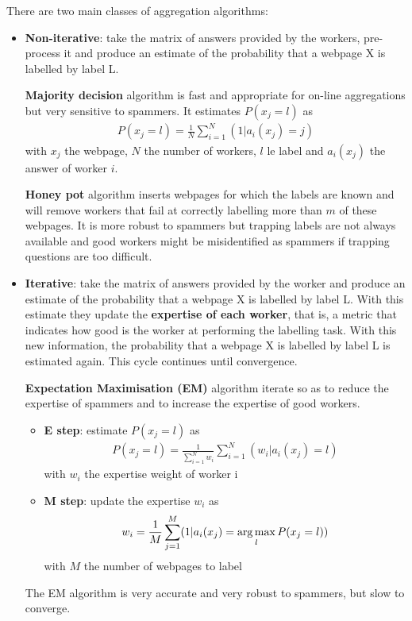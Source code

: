 There are two main classes of aggregation algorithms:
\begin{itemize}
	\item \textbf{Non-iterative}: take the matrix of answers provided by the workers, pre-process it and produce an estimate of the probability that a webpage X is labelled by label L.

	\textbf{Majority decision} algorithm is fast and appropriate for on-line aggregations but very sensitive to spammers. It estimates $P(x_j = l)$ as 
	\begin{align*}
		P(x_j = l) = \frac{1}{N} \sum_{i = 1}^N (1 | a_i(x_j) = j)
	\end{align*}
	with $x_j$ the webpage, $N$ the number of workers, $l$ le label and $a_i(x_j)$ the answer of worker $i$.

	\textbf{Honey pot} algorithm inserts webpages for which the labels are known and will remove workers that fail at correctly labelling more than $m$ of these webpages. It is more robust to spammers but trapping labels are not always available and good workers might be misidentified as spammers if trapping questions are too difficult.

	\item \textbf{Iterative}: take the matrix of answers provided by the worker and produce an estimate of the probability that a webpage X is labelled by label L. With this estimate they update the \textbf{expertise of each worker}, that is, a metric that indicates how good is the worker at performing the labelling task. With this new information, the probability that a webpage X is labelled by label L is estimated again. This cycle continues until convergence.

	\textbf{Expectation Maximisation (EM)} algorithm iterate so as to reduce the expertise of spammers and to increase the expertise of good workers.
	\begin{itemize}
		\item \textbf{E step}: estimate $P(x_j = l)$ as
		\begin{align*}
			P(x_j = l) = \frac{1}{\sum_{i = 1}^N w_i} \sum_{i = 1}^N (w_i | a_i(x_j) = l)
		\end{align*}
		with $w_i$ the expertise weight of worker i

		\item \textbf{M step}: update the expertise $w_i$ as
		\begin{align*}
			w_i = \frac{1}{M} \sum_{j = 1}^M (1 | a_i(x_j) = \operatorname*{arg\,max}_l P(x_j = l))
		\end{align*}
		with $M$ the number of webpages to label
	\end{itemize}

	The EM algorithm is very accurate and very robust to spammers, but slow to converge.
\end{itemize}

